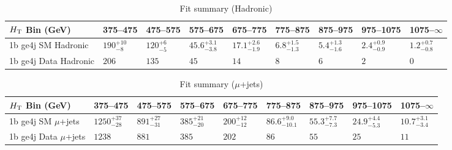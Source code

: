 \documentclass[8pt]{article}
\def\scalht{\mbox{$H_{\rm{T}}$}\xspace}
\newcommand\T{\rule{0pt}{2.6ex}}
\begin{document}
\begin{table}[ht!]
\caption{Fit summary (Hadronic)}
\label{tab:ensemble-summary}
\centering
\begin{tabular}{ lllllllll }

\hline
\scalht Bin (GeV)       & 375--475                       & 475--575                       & 575--675                       & 675--775                       & 775--875                       & 875--975                       & 975--1075                      & 1075--$\infty$                 \\ [1.000000ex]
\hline
1b ge4j SM Hadronic\T   & $190^{+10}_{-8}$               & $120^{+6}_{-5}$                & $45.6^{+3.1}_{-3.8}$           & $17.1^{+2.6}_{-1.9}$           & $6.8^{+1.5}_{-1.3}$            & $5.4^{+1.3}_{-1.6}$            & $2.4^{+0.9}_{-0.9}$            & $1.2^{+0.7}_{-0.8}$            \\ 
1b ge4j Data Hadronic\T & $206$                          & $135$                          & $45$                           & $14$                           & $8$                            & $6$                            & $2$                            & $0$                            \\ 
\hline

\end{tabular}
\end{table}
\begin{table}[ht!]
\caption{Fit summary ($\mu$+jets)}
\label{tab:ensemble-summary}
\centering
\begin{tabular}{ lllllllll }

\hline
\scalht Bin (GeV)       & 375--475                       & 475--575                       & 575--675                       & 675--775                       & 775--875                       & 875--975                       & 975--1075                      & 1075--$\infty$                 \\ [1.000000ex]
\hline
1b ge4j SM $\mu$+jets\T & $1250^{+37}_{-28}$             & $891^{+27}_{-31}$              & $385^{+21}_{-20}$              & $200^{+12}_{-12}$              & $86.6^{+9.0}_{-10.1}$          & $55.3^{+7.7}_{-7.3}$           & $24.9^{+4.4}_{-5.3}$           & $10.7^{+3.1}_{-3.4}$           \\ 
1b ge4j Data $\mu$+jets\T & $1238$                         & $881$                          & $385$                          & $202$                          & $86$                           & $55$                           & $25$                           & $11$                           \\ 
\hline

\end{tabular}
\end{table}
\end{document}
